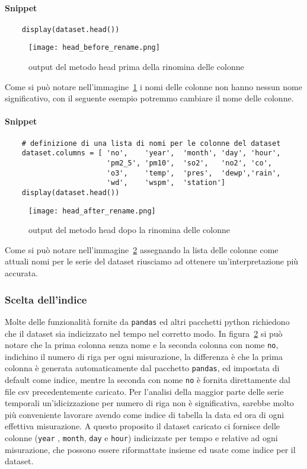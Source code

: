 \paragraph{Snippet}
\begin{verbatim}
    display(dataset.head())
\end{verbatim}
\begin{figure}[h!]
    \texttt{[image: head\_before\_rename.png]}
    \caption{output del metodo head prima della rinomina delle colonne}
    \label{fig:head_before_rename}
\end{figure}
Come si può notare nell'immagine~\ref*{fig:head_before_rename} i nomi delle colonne 
non hanno nessun nome significativo, con il seguente esempio potremmo
cambiare il nome delle colonne.

\paragraph{Snippet}
\begin{verbatim}
    # definizione di una lista di nomi per le colonne del dataset
    dataset.columns = [ 'no',    'year',  'month', 'day', 'hour', 
                        'pm2_5', 'pm10',  'so2',   'no2', 'co',  
                        'o3',    'temp',  'pres',  'dewp','rain',  
                        'wd',    'wspm',  'station']
    display(dataset.head())
\end{verbatim}
\begin{figure}[h!]
    \texttt{[image: head\_after\_rename.png]}
    \caption{output del metodo head dopo la rinomina delle colonne}
    \label{fig:head_after_rename}
\end{figure}
Come si può notare nell'immagine~\ref*{fig:head_after_rename}
assegnando la lista delle colonne come attuali nomi per le serie del dataset
riusciamo ad ottenere un'interpretazione più accurata.


\subsubsection{Scelta dell'indice}
Molte delle funzionalità fornite da \texttt{pandas} ed altri pacchetti python
richiedono che il dataset sia indicizzato nel tempo nel corretto modo.
In figura~\ref*{fig:head_after_rename} si può notare che la prima colonna
senza nome e la seconda colonna con nome \texttt{no}, indichino
il numero di riga per ogni misurazione, la differenza è che la prima colonna
è generata automaticamente dal pacchetto \texttt{pandas}, ed impostata
di default come indice, mentre la seconda con
nome \texttt{no} è fornita direttamente dal file csv precedentemente caricato.
Per l'analisi della maggior parte delle serie temporali un'idicizzazione per numero
di riga non è significativa, sarebbe molto più conveniente lavorare avendo
come indice di tabella la data ed ora di ogni effettiva misurazione.
A questo proposito il dataset caricato ci fornisce delle colonne (\texttt{year}
, \texttt{month}, \texttt{day} e \texttt{hour}) indicizzate per tempo e relative
ad ogni misurazione, che possono essere riformattate insieme ed usate come indice
per il dataset.

